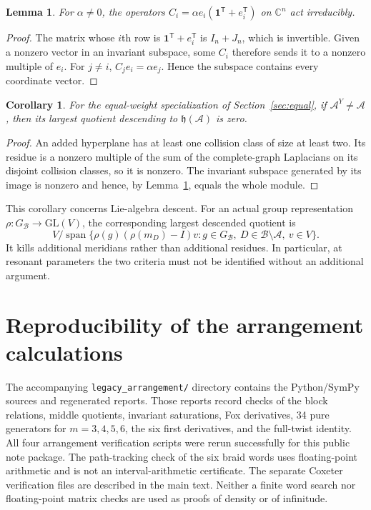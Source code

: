 \documentclass[11pt,a4paper]{article}
\newtheorem{lemma}[theorem]{Lemma}
\newtheorem{corollary}[theorem]{Corollary}
\theoremstyle{remark}\newtheorem{remark}[theorem]{Remark}
\newcommand{\C}{\mathbb C}
\newcommand{\A}{\mathcal A}
\newcommand{\B}{\mathcal B}
\newcommand{\h}{\mathfrak h}
\newcommand{\one}{\mathbf 1}
\begin{document}
\begin{lemma}\label{lem:irred}
For $\alpha\ne0$, the operators
$C_i=\alpha e_i(\one^{\mathsf T}+e_i^{\mathsf T})$ on $\C^n$
act irreducibly.
\end{lemma}
\begin{proof}
The matrix whose $i$th row is $\one^{\mathsf T}+e_i^{\mathsf T}$ is
$I_n+J_n$, which is invertible.  Given a nonzero vector in an invariant
subspace, some $C_i$ therefore sends it to a nonzero multiple of $e_i$.
For $j\ne i$, $C_j e_i=\alpha e_j$.  Hence the subspace contains every
coordinate vector.
\end{proof}

\begin{corollary}\label{cor:zero}
For the equal-weight specialization of Section~\ref{sec:equal}, if $\A^Y\ne\A$,
then its largest quotient descending to $\h(\A)$ is zero.
\end{corollary}
\begin{proof}
An added hyperplane has at least one collision class of size at least
two.  Its residue is a nonzero multiple of the sum of the complete-graph
Laplacians on its disjoint collision classes, so it is nonzero.  The
invariant subspace generated by its image is nonzero and hence, by
Lemma~\ref{lem:irred}, equals the whole module.
\end{proof}

This corollary concerns Lie-algebra descent.  For an actual group
representation $\rho:G_{\B}\to\mathrm{GL}(V)$, the corresponding
largest descended quotient is
\[
V\big/\operatorname{span}\{\rho(g)(\rho(m_D)-I)v:
g\in G_{\B},\ D\in\B\setminus\A,\ v\in V\}.
\]
It kills additional meridians rather than additional residues.  In
particular, at resonant parameters the two criteria must not be
identified without an additional argument.


\section{Reproducibility of the arrangement calculations}
The accompanying \texttt{legacy\_arrangement/} directory contains the
Python/SymPy sources and regenerated reports.  Those reports record checks of
the block relations, middle quotients, invariant saturations, Fox
derivatives, 34 pure generators for $m=3,4,5,6$, the six first derivatives,
and the full-twist identity.  All four arrangement verification scripts
were rerun successfully for this public note package.
The path-tracking check of the six braid words uses floating-point
arithmetic and is not an interval-arithmetic certificate.
The separate Coxeter verification files are described in the main text.
Neither a finite word search nor floating-point matrix checks are used
as proofs of density or of infinitude.
\end{document}
